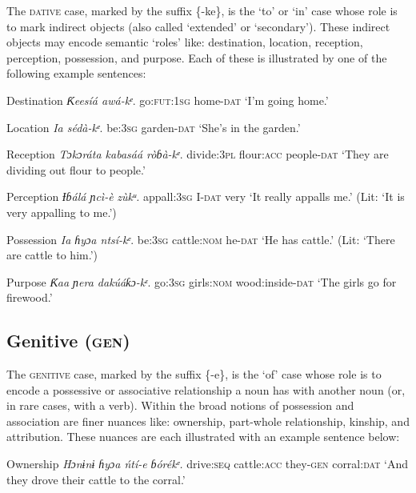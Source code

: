 The \textsc{dative} case, marked by the suffix \{-ke\}, is the ‘to’ or ‘in’ case whose role is to mark indirect objects (also called ‘extended’ or ‘secondary’). These indirect objects may encode semantic ‘roles’ like: destination, location, reception, perception, possession, and purpose. Each of these is illustrated by one of the following example sentences:




Destination
\textit{Ƙeesíá   awá-}\textit{kᵉ}.
go:\textsc{fut:1sg}   home-\textsc{dat}
‘I’m going home.’




Location
\textit{Ia     sédà-}\textit{kᵉ}.
be:\textsc{3sg}   garden-\textsc{dat}
‘She’s in the garden.’


Reception
\textit{Tɔkɔráta   kabasáá   ròɓà-}\textit{kᵉ}.
divide:\textsc{3pl}   flour:\textsc{acc}   people-\textsc{dat}
‘They are dividing out flour to people.’




Perception
\textit{Ɨɓálá     ɲcì-}\textit{è}\textit{   zùkᵘ.}
appall:\textsc{3sg}   I-\textsc{dat}   very
‘It really appalls me.’ (Lit: ‘It is very appalling to me.’)




Possession
\textit{Ia     ɦyɔa     ntsí-}\textit{kᵉ}.
be:\textsc{3sg}   cattle:\textsc{nom}    he-\textsc{dat}
‘He has cattle.’ (Lit: ‘There are cattle to him.’)




Purpose
\textit{Ƙaa     ɲera     dakúáƙɔ-}\textit{kᵋ}.
go:\textsc{3sg}   girls:\textsc{nom}   wood:inside-\textsc{dat}
‘The girls go for firewood.’






\subsection{Genitive (\textsc{gen})}


The \textsc{genitive }case, marked by the suffix \{-e\}, is the ‘of’ case whose role is to encode a possessive or associative relationship a noun has with another noun (or, in rare cases, with a verb). Within the broad notions of possession and association are finer nuances like: ownership, part-whole relationship, kinship, and attribution. These nuances are each illustrated with an example sentence below:




Ownership
\textit{Hɔnɨnɨ   ɦyɔa     ńtí-}\textit{e}\textit{     ɓórékᵉ.}
drive:\textsc{seq}   cattle:\textsc{acc}   they-\textsc{gen}   corral:\textsc{dat}
‘And they drove their cattle to the corral.’




